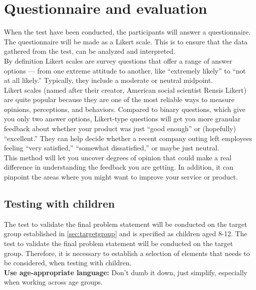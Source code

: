 \section{Questionnaire and evaluation}
When the test have been conducted, the participants will answer a questionnaire. The questionnaire will be made as a Likert scale. This is to ensure that the data gathered from the test, can be analyzed and interpreted\cite{likertScale}.\\

By definition Likert scales are survey questions that offer a range of answer options — from one extreme attitude to another, like “extremely likely” to “not at all likely.” Typically, they include a moderate or neutral midpoint\cite{likertScale}.\\

Likert scales (named after their creator, American social scientist Rensis Likert) are quite popular because they are one of the most reliable ways to measure opinions, perceptions, and behaviors.
Compared to binary questions, which give you only two answer options, Likert-type questions will get you more granular feedback about whether your product was just “good enough” or (hopefully) “excellent.” They can help decide whether a recent company outing left employees feeling “very satisfied,” “somewhat dissatisfied,” or maybe just neutral\cite{likertScale}.\\

This method will let you uncover degrees of opinion that could make a real difference in understanding the feedback you are getting. In addition, it can pinpoint the areas where you might want to improve your service or product\cite{likertScale}.\\

\subsection{Testing with children}
The test to validate the final problem statement will be conducted on the target group established in \autoref{sec:targetgroup} and is specified as children aged 8-12. The test to validate the final problem statement will be conducted on the target group. Therefore, it is necessary to establish a selection of elements that needs to be considered, when testing with children.\\

\textbf{Use age-appropriate language:} Don’t dumb it down, just simplify, especially when working across age groups\cite{testwithkids}.\\

